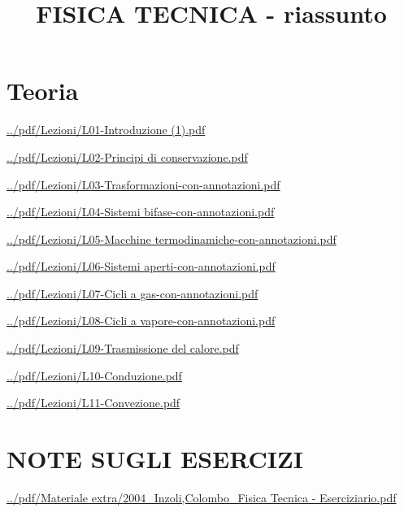 \documentclass[a4paper, 9pt]{article}
\title{FISICA TECNICA - riassunto}
\begin{document}
    \maketitle
    \tableofcontents{}
    \newpage
    \part{Teoria}
    \newpage
    \url{../pdf/Lezioni/L01-Introduzione (1).pdf}
    
    \newpage
    \url{../pdf/Lezioni/L02-Principi di conservazione.pdf}
    
    \newpage
    \url{../pdf/Lezioni/L03-Trasformazioni-con-annotazioni.pdf}
    
    \newpage
    \url{../pdf/Lezioni/L04-Sistemi bifase-con-annotazioni.pdf}
    
    \newpage
    \url{../pdf/Lezioni/L05-Macchine termodinamiche-con-annotazioni.pdf}
    
    \newpage
    \url{../pdf/Lezioni/L06-Sistemi aperti-con-annotazioni.pdf}
    
    \newpage
    \url{../pdf/Lezioni/L07-Cicli a gas-con-annotazioni.pdf}
    
    \newpage
    \url{../pdf/Lezioni/L08-Cicli a vapore-con-annotazioni.pdf}
    
    \newpage
    \url{../pdf/Lezioni/L09-Trasmissione del calore.pdf}
    
    \newpage
    \url{../pdf/Lezioni/L10-Conduzione.pdf}
    
    \newpage
    \url{../pdf/Lezioni/L11-Convezione.pdf}
    
    \newpage
    \part{NOTE SUGLI ESERCIZI}
    \newpage
    \url{../pdf/Materiale extra/2004_Inzoli,Colombo_Fisica Tecnica - Eserciziario.pdf}
    
\end{document}
